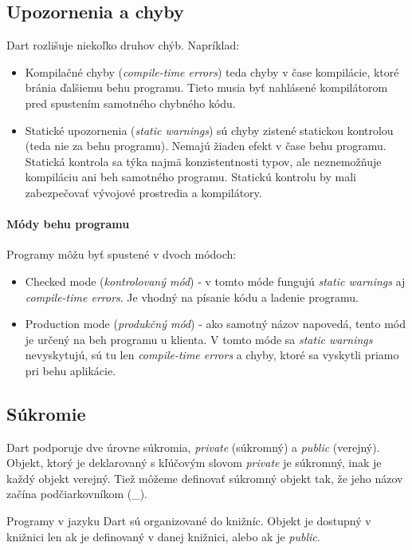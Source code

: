 \subsection{Upozornenia a chyby}%
Dart rozlišuje niekoľko druhov chýb. Napríklad:
\begin{itemize}
\item Kompilačné chyby (\emph{compile-time errors}) teda chyby v čase kompilácie, ktoré bránia ďalšiemu behu programu. Tieto musia byť nahlásené kompilátorom pred spustením samotného chybného kódu.
\item Statické upozornenia (\emph{static warnings}) sú chyby zistené statickou kontrolou (teda nie za behu programu). Nemajú žiaden efekt v čase behu programu.
Statická kontrola sa týka najmä konzistentnosti typov, ale neznemožňuje kompiláciu ani beh samotného programu. Statickú kontrolu by mali zabezpečovať vývojové prostredia a kompilátory.
\end{itemize}

\paragraph{Módy behu programu}
Programy môžu byť spustené v dvoch módoch:
\begin{itemize}
\item Checked mode (\emph{kontrolovaný mód}) - v tomto móde fungujú \emph{static warnings} aj \emph{compile-time errors}. Je vhodný na písanie kódu a ladenie programu.
\item Production mode (\emph{produkčný mód}) - ako samotný názov napovedá, tento mód je určený na beh programu u klienta. V tomto móde sa \emph{static warnings} nevyskytujú, sú tu len \emph{compile-time errors} a chyby, ktoré sa vyskytli priamo pri behu aplikácie.
\end{itemize}

\subsection{Súkromie}
Dart podporuje dve úrovne súkromia, \emph{private} (súkromný) a \emph{public} (verejný).
Objekt, ktorý je deklarovaný s kľúčovým slovom \emph{private} je súkromný, inak je každý objekt verejný. 
Tiež môžeme definovať súkromný objekt tak, že jeho názov začína podčiarkovníkom (\glqq\_\grqq). 

Programy v jazyku Dart sú organizované do knižníc. Objekt je dostupný v knižnici len ak je definovaný v danej knižnici, alebo ak je \emph{public}.

